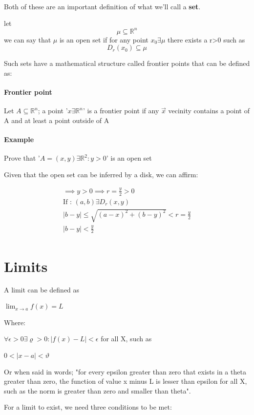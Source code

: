 \documentclass[11pt,fleqn]{book} %
\begin{document}
Both of these are an important definition of what we'll call a \textbf{set}. 

let $$ \mu \subseteq \mathbb{R}^n $$ we can say that $\mu$ is an open set if  for any point $x_0 \exists \mu$
there exists a r>0 such as $$D_r(x_0) \subseteq \mu$$

Such sets have a mathematical structure called frontier points that can be defined as:
\paragraph*{Frontier point}
Let $ A \subseteq \mathbb{R}^n $; a point '$x \exists \mathbb{R}^n$' is a frontier point if any $ \vec{x} $
vecinity contains a point of A and at least a point outside of A

\paragraph*{Example}

Prove that '$A = (x,y)\exists\mathbb{R}^2: y > 0$' is an open set

Given that the open set can be inferred by a disk, we can affirm:

\begin{gather}
    \implies y>0 \implies r = \frac{y}{2} > 0 \\
    \text{If : }(a,b)\exists D_r(x,y)\\
    | b-y | \le \sqrt{(a-x)^2 + (b-y)^2} < r = \frac{y}{2} \\
    |b-y| < \frac{y}{2}\\
\end{gather}

\section{Limits}
A limit can be defined as

$ \lim_{x \to a} f(x) = L $

Where:

$ \forall \epsilon > 0 \exists \varrho > 0: | f(x) - L | < \epsilon $
for all X, such as 

$ 0 < |x-a| < \vartheta $

Or when said in words; "for every epsilon greater than zero that exists in a theta greater than zero, the function of value x minus L is lesser than epsilon for all X, such as the norm is greater than zero and smaller than theta".

For a limit to exist, we need three conditions to be met:
\end{document}
